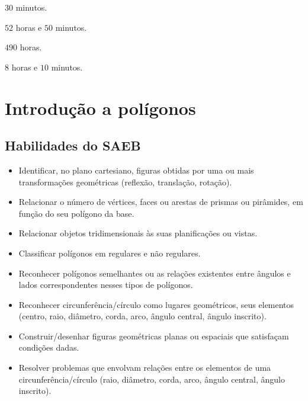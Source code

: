 {{{{\begin{multicols}{2}
\begin{escolha}
\item $30$ minutos.
\item $52$ horas e $50$ minutos.
\item $490$ horas.
\item $8$ horas e $10$ minutos.
\end{escolha}
\end{multicols}



\chapter{Introdução a polígonos}

\section*{Habilidades do SAEB} 
\begin{itemize}
\item Identificar, no plano cartesiano, figuras obtidas
por uma ou mais transformações geométricas (reflexão, translação,
rotação).
\item
  Relacionar o número de vértices, faces ou arestas de prismas ou
  pirâmides, em função do seu polígono da base.
\item
  Relacionar objetos tridimensionais às suas planificações ou vistas.
\item
  Classificar polígonos em regulares e não regulares.
\item
  Reconhecer polígonos semelhantes ou as relações existentes entre
  ângulos e lados correspondentes nesses tipos de polígonos.
\item
  Reconhecer circunferência/círculo como lugares geométricos, seus
  elementos (centro, raio, diâmetro, corda, arco, ângulo central, ângulo
  inscrito).
\item
  Construir/desenhar figuras geométricas planas ou espaciais que
  satisfaçam condições dadas.
\item
  Resolver problemas que envolvam relações entre os elementos de uma
  circunferência/círculo (raio, diâmetro, corda, arco, ângulo central,
  ângulo inscrito).
\end{itemize}

}}}}
